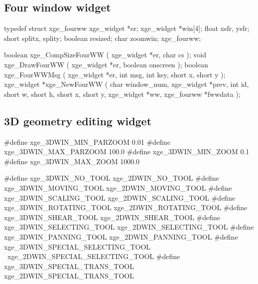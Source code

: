 \subsection{Four window widget}

\begin{listingC}
typedef struct xge_fourww {
    xge_widget *er;
    xge_widget *win[4];
    float      xsfr, ysfr;
    short      splitx, splity;
    boolean    resized;
    char       zoomwin;
  } xge_fourww;
\end{listingC}

\begin{listingC}
boolean xge_CompSizeFourWW ( xge_widget *er, char cs );
void xge_DrawFourWW ( xge_widget *er, boolean onscreen );
boolean xge_FourWWMsg ( xge_widget *er,
                        int msg, int key, short x, short y );
xge_widget *xge_NewFourWW ( char window_num, xge_widget *prev,
                            int id,
                            short w, short h, short x, short y,
                            xge_widget *ww, xge_fourww *fwwdata );
\end{listingC}


\subsection{3D geometry editing widget}

\begin{listingC}
#define xge_3DWIN_MIN_PARZOOM   0.01
#define xge_3DWIN_MAX_PARZOOM 100.0
#define xge_3DWIN_MIN_ZOOM      0.1
#define xge_3DWIN_MAX_ZOOM   1000.0

#define xge_3DWIN_NO_TOOL                xge_2DWIN_NO_TOOL
#define xge_3DWIN_MOVING_TOOL            xge_2DWIN_MOVING_TOOL
#define xge_3DWIN_SCALING_TOOL           xge_2DWIN_SCALING_TOOL
#define xge_3DWIN_ROTATING_TOOL          xge_2DWIN_ROTATING_TOOL
#define xge_3DWIN_SHEAR_TOOL             xge_2DWIN_SHEAR_TOOL
#define xge_3DWIN_SELECTING_TOOL         xge_2DWIN_SELECTING_TOOL
#define xge_3DWIN_PANNING_TOOL           xge_2DWIN_PANNING_TOOL
#define xge_3DWIN_SPECIAL_SELECTING_TOOL \
                                  xge_2DWIN_SPECIAL_SELECTING_TOOL
#define xge_3DWIN_SPECIAL_TRANS_TOOL     xge_2DWIN_SPECIAL_TRANS_TOOL
\end{listingC}

